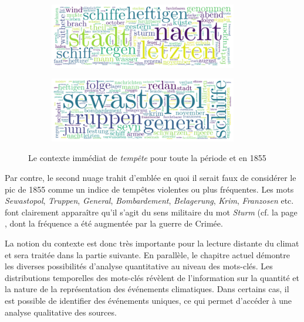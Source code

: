\documentclass[a4paper,twoside,12pt]{article}
\begin{document}
\begin{figure}[h!]
\centering
\begin{subfigure}
    \centering
    \includegraphics[width=0.9\textwidth]{images/wordcloud_sturm.pdf}
\end{subfigure}
\begin{subfigure}
    \centering
    \includegraphics[width=0.9\textwidth]{images/wordcloud_sturm_1855.pdf}
\end{subfigure}
\caption{Le contexte immédiat de \textit{tempête} pour toute la période et en 1855}
\label{fig:sturm_wordclouds}
\end{figure}

Par contre, le second nuage trahit d'emblée en quoi il serait faux de considérer le pic de 1855 comme un indice de tempêtes violentes ou plus fréquentes. Les mots \textit{Sewastopol}, \textit{Truppen}, \textit{General}, \textit{Bombardement}, \textit{Belagerung}, \textit{Krim}, \textit{Franzosen} etc. font clairement apparaître qu'il s'agit du sens militaire du mot \textit{Sturm} (cf. la page \pageref{synonymes}, dont la fréquence a été augmentée par la guerre de Crimée.

La notion du contexte est donc très importante pour la lecture distante du climat et sera traitée dans la partie suivante. En parallèle, le chapitre actuel démontre les diverses possibilités d'analyse quantitative au niveau des mots-clés. Les distributions temporelles des mots-clés révèlent de l'information sur la quantité et la nature de la représentation des événements climatiques. Dans certains cas, il est possible de identifier des événements uniques, ce qui permet d'accéder à une analyse qualitative des sources.
\end{document}
